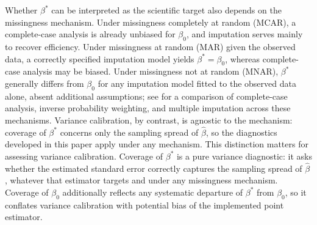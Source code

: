 Whether \(\beta^\ast\) can be interpreted as the scientific target also
depends on the missingness mechanism.  Under missingness completely at
random (MCAR), a complete-case analysis is already unbiased for
\(\beta_0\), and imputation serves mainly to recover efficiency.  Under
missingness at random (MAR) given the observed data, a correctly
specified imputation model yields \(\beta^\ast=\beta_0\), whereas
complete-case analysis may be biased.  Under missingness not at random
(MNAR), \(\beta^\ast\) generally differs from \(\beta_0\) for any
imputation model fitted to the observed data alone, absent additional
assumptions; see \citet{little2024comparison} for a comparison of
complete-case analysis, inverse probability weighting, and multiple
imputation across these mechanisms.  Variance calibration, by
contrast, is agnostic to the mechanism: coverage of \(\beta^\ast\)
concerns only the sampling spread of \(\hat\beta\), so the diagnostics
developed in this paper apply under any mechanism.
This distinction matters for assessing variance calibration.  Coverage
of \(\beta^\ast\) is a pure variance diagnostic: it asks whether the
estimated standard error correctly captures the sampling spread of
\(\hat\beta\), whatever that estimator targets and under any
missingness mechanism.  Coverage of \(\beta_0\) additionally reflects
any systematic departure of \(\beta^\ast\) from \(\beta_0\), so it
conflates variance calibration with potential bias of the implemented
point estimator.
